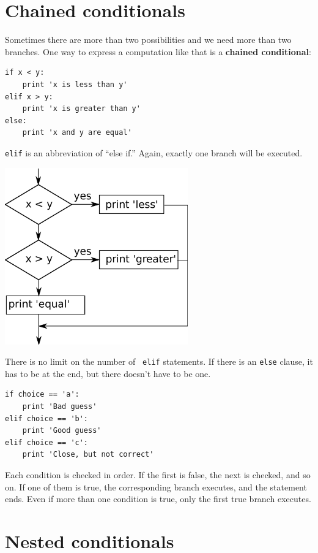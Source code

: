 \documentclass[10pt]{book}
\begin{document}
\section{Chained conditionals}

Sometimes there are more than two possibilities and we need more than
two branches.  One way to express a computation like that is a {\bf
chained conditional}:

\beforeverb
\begin{verbatim}
if x < y:
    print 'x is less than y'
elif x > y:
    print 'x is greater than y'
else:
    print 'x and y are equal'
\end{verbatim}
\afterverb
%
{\tt elif} is an abbreviation of ``else if.''  Again, exactly one
branch will be executed.  

\beforefig
\centerline{\includegraphics[height=3.00in]{figs2/elif.eps}}
\afterfig

There is no limit on the number of {\tt
elif} statements.  If there is an {\tt else} clause, it has to be
at the end, but there doesn't have to be one.



\beforeverb
\begin{verbatim}
if choice == 'a':
    print 'Bad guess'
elif choice == 'b':
    print 'Good guess'
elif choice == 'c':
    print 'Close, but not correct'
\end{verbatim}
\afterverb
%
Each condition is checked in order.  If the first is false,
the next is checked, and so on.  If one of them is
true, the corresponding branch executes, and the statement
ends.  Even if more than one condition is true, only the
first true branch executes.  


\section{Nested conditionals}
\end{document}
